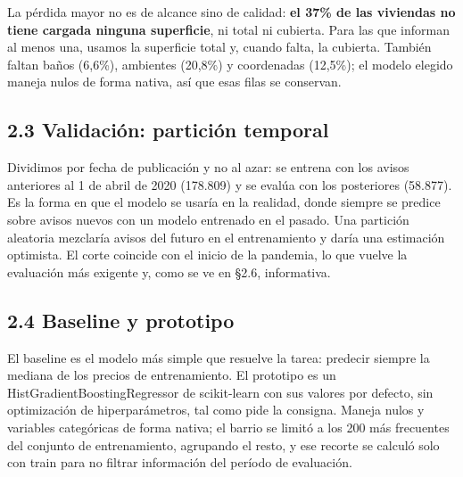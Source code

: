 \documentclass[11pt,a4paper]{article}
\begin{document}
La pérdida mayor no es de alcance sino de calidad: \textbf{el 37\% de las viviendas no tiene cargada ninguna superficie}, ni total ni cubierta. Para las que informan al menos una, usamos la superficie total y, cuando falta, la cubierta. También faltan baños (6,6\%), ambientes (20,8\%) y coordenadas (12,5\%); el modelo elegido maneja nulos de forma nativa, así que esas filas se conservan.

\subsection*{2.3 Validación: partición temporal}

Dividimos por fecha de publicación y no al azar: se entrena con los avisos anteriores al 1 de abril de 2020 (178.809) y se evalúa con los posteriores (58.877). Es la forma en que el modelo se usaría en la realidad, donde siempre se predice sobre avisos nuevos con un modelo entrenado en el pasado. Una partición aleatoria mezclaría avisos del futuro en el entrenamiento y daría una estimación optimista. El corte coincide con el inicio de la pandemia, lo que vuelve la evaluación más exigente y, como se ve en §2.6, informativa.

\subsection*{2.4 Baseline y prototipo}

El baseline es el modelo más simple que resuelve la tarea: predecir siempre la mediana de los precios de entrenamiento. El prototipo es un HistGradientBoostingRegressor de scikit-learn con sus valores por defecto, sin optimización de hiperparámetros, tal como pide la consigna. Maneja nulos y variables categóricas de forma nativa; el barrio se limitó a los 200 más frecuentes del conjunto de entrenamiento, agrupando el resto, y ese recorte se calculó solo con train para no filtrar información del período de evaluación.
\end{document}
